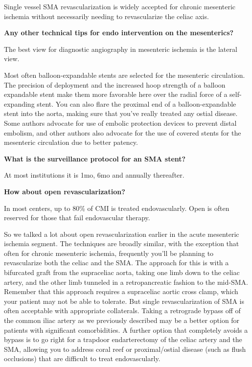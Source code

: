 \documentclass[
]{book}
\begin{document}
Single vessel SMA revascularization is widely accepted for chronic
mesenteric ischemia without necessarily needing to revascularize the
celiac axis. \citep{oderich132ChronicMesenteric2019, foleyRevascularizationSuperiorMesenteric2000}

\textbf{Any other technical tips for endo intervention on the mesenterics?}

The best view for diagnostic angiography in mesenteric ischemia is the
lateral view.

Most often balloon-expandable stents are selected for the mesenteric
circulation. The precision of deployment and the increased hoop strength
of a balloon expandable stent make them more favorable here over the
radial force of a self-expanding stent. You can also flare the proximal
end of a balloon-expandable stent into the aorta, making sure that
you've really treated any ostial disease. Some authors advocate for use
of embolic protection devices to prevent distal embolism, and other
authors also advocate for the use of covered stents for the mesenteric
circulation due to better patency.\citep{oderichComparisonCoveredStents2013, oderich132ChronicMesenteric2019}

\textbf{What is the surveillance protocol for an SMA stent?}

At most institutions it is 1mo, 6mo and annually
thereafter.\citep{mohler2012, zierler2018}

\textbf{How about open revascularization?}

In most centers, up to 80\% of CMI is treated endovascularly. Open is
often reserved for those that fail endovascular
therapy.\citep{oderichOpenSurgicalTreatment2010, oderich132ChronicMesenteric2019}

So we talked a lot about open revascularization earlier in the acute
mesenteric ischemia segment. The techniques are broadly similar, with
the exception that often for chronic mesenteric ischemia, frequently
you'll be planning to revascularize both the celiac and the SMA. The
approach for this is with a bifurcated graft from the supraceliac aorta,
taking one limb down to the celiac artery, and the other limb tunneled
in a retropancreatic fashion to the mid-SMA. Remember that this approach
requires a supraceliac aortic cross clamp, which your patient may not be
able to tolerate. But single revascularization of SMA is often
acceptable with appropriate collaterals. Taking a retrograde bypass off
of the common iliac artery as we previously described may be a better
option for patients with significant comorbidities. A further option
that completely avoids a bypass is to go right for a trapdoor
endarterectomy of the celiac artery and the SMA, allowing you to address
coral reef or proximal/ostial disease (such as flush occlusions) that
are difficult to treat endovascularly.~
\end{document}
